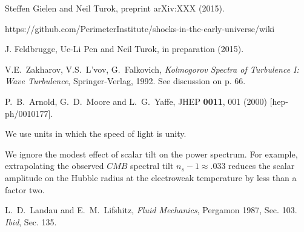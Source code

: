 \documentclass[prl,aps,10pt,twocolumn,showkeys,nofootinbib]{revtex4-1}
\begin{document}
\begin{thebibliography}{99}

 Steffen Gielen and Neil Turok, preprint arXiv:XXX (2015). 

 https://github.com/PerimeterInstitute/shocks-in-the-early-universe/wiki



 J. Feldbrugge, Ue-Li Pen and Neil Turok, in preparation (2015). 

 V.E.~Zakharov, V.S.~L'vov, G.~Falkovich, {\em Kolmogorov Spectra of Turbulence I: Wave Turbulence}, Springer-Verlag, 1992. See discussion on p. 66.



  P.~B.~Arnold, G.~D.~Moore and L.~G.~Yaffe,
  JHEP {\bf 0011}, 001 (2000)
  [hep-ph/0010177].

 We use units in which the speed of light is unity. 

 We ignore the modest effect of scalar tilt on the power spectrum. For example, extrapolating the observed $CMB$ spectral tilt $n_s-1\approx .033$ reduces the scalar amplitude on the Hubble radius at the electroweak temperature by less than a factor two. 


 L.~D.~Landau and E.~M.~Lifshitz, {\it Fluid Mechanics}, Pergamon 1987, Sec. 103. 
 {\it Ibid}, Sec. 135. 



\end{thebibliography}
\end{document}
